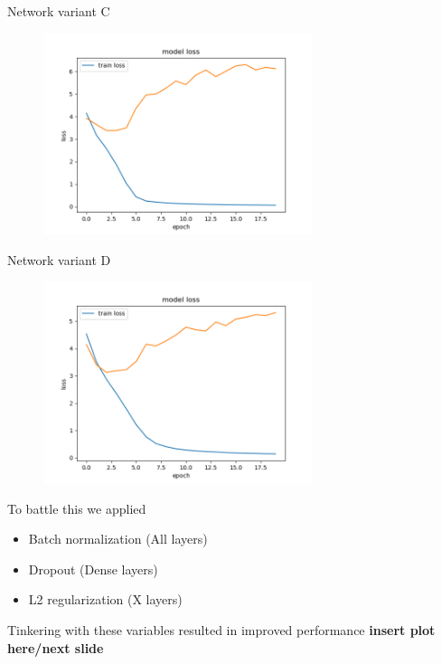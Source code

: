 \documentclass{beamer}
\begin{document}
\begin{frame}
\centering
Network variant C
\begin{figure}[!h]
\centering
\includegraphics[width=0.7\textwidth]{images/run1_loss_c.png}
\end{figure}
\end{frame}

\begin{frame}
\centering
Network variant D
\begin{figure}[!h]
\centering
\includegraphics[width=0.7\textwidth]{images/run1_loss_d.png}
\end{figure}
\end{frame}




\begin{frame}
  To battle this we applied
  \begin{itemize}
    \item Batch normalization (All layers)
    \item Dropout (Dense layers)
    \item L2 regularization (X layers)
  \end{itemize}
  Tinkering with these variables resulted in improved performance \textbf{insert plot here/next slide}
\end{frame}
\end{document}
